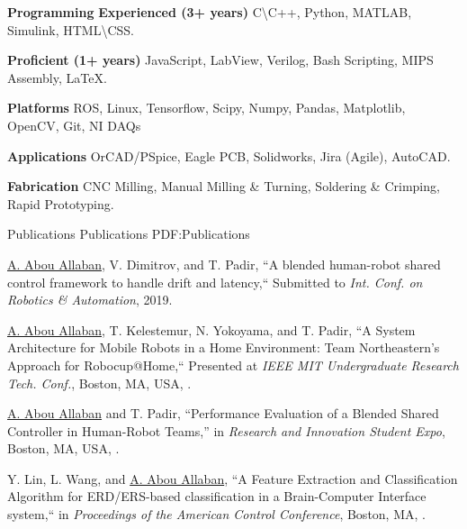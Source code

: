 \documentclass[letterpaper,MMMyyyy,nonstopmode]{simpleresumecv}
\begin{document}
\begin{Body}
\Entry
\textbf{Programming}
\BulletItem
\textbf{Experienced (3+ years)}
\newline
C\textbackslash C++, Python, MATLAB, Simulink, HTML\textbackslash CSS.

\BulletItem
\textbf{Proficient (1+ years)}
\newline
JavaScript,
LabView,
Verilog,
Bash Scripting,
MIPS Assembly,
{\LaTeX}.

\textbf{Platforms}
\newline
ROS, Linux, Tensorflow, Scipy, Numpy, Pandas, Matplotlib, OpenCV,  Git, NI DAQs

\textbf{Applications}
\newline
OrCAD/PSpice, Eagle PCB, Solidworks, Jira (Agile), AutoCAD.

\textbf{Fabrication}
\newline
CNC Milling, Manual Milling \& Turning, Soldering \& Crimping, Rapid Prototyping.


\Section
{Publications}
{Publications}
{PDF:Publications}


\BigGap
\NumberedItem{[1]}
{\underline{A. Abou Allaban}, V. Dimitrov, and T. Padir, 
``A blended human-robot shared control framework to handle drift and latency,``
Submitted to \textit{Int. Conf. on Robotics \& Automation}, 2019.}

\Gap
\NumberedItem{[2]}
{\underline{A. Abou Allaban}, T. Kelestemur, N. Yokoyama, and T. Padir,
	``A System Architecture for Mobile Robots in a Home Environment: Team Northeastern’s Approach for Robocup@Home,``
	Presented at \textit{IEEE MIT Undergraduate Research Tech. Conf.}, 
	Boston, MA, USA,
	.}

\Gap
\NumberedItem{[3]}
{\underline{A. Abou Allaban} and T. Padir,
	``Performance Evaluation of a Blended Shared Controller in Human-Robot Teams,''
	in \textit{Research and Innovation Student Expo},
	Boston, MA, USA,
	.}

\Gap
\NumberedItem{[4]}
{Y. Lin, L. Wang, and \underline{A. Abou Allaban},
``A Feature Extraction and Classification Algorithm for ERD/ERS-based classification in a Brain-Computer Interface system,``
in \textit{Proceedings of the American Control Conference},
Boston, MA,
.}


\end{Body}
\end{document}
